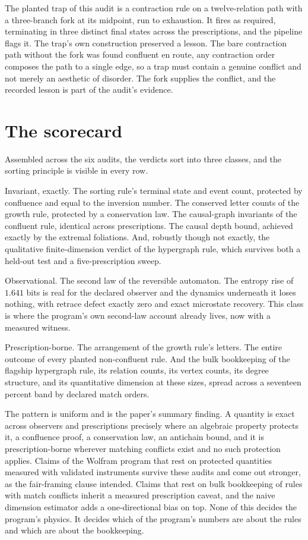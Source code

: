 \documentclass[aps,pre,reprint,nofootinbib]{revtex4-2}
\begin{document}
The planted trap of this audit is a contraction rule on a
twelve-relation path with a three-branch fork at its midpoint, run to
exhaustion.  It fires as required, terminating in three distinct
final states across the prescriptions, and the pipeline flags it.
The trap's own construction preserved a lesson.  The bare contraction
path without the fork was found confluent en route, any contraction
order composes the path to a single edge, so a trap must contain a
genuine conflict and not merely an aesthetic of disorder.  The fork
supplies the conflict, and the recorded lesson is part of the audit's
evidence.

\section{The scorecard}
\label{sec:scorecard}

Assembled across the six audits, the verdicts sort into three classes,
and the sorting principle is visible in every row.

Invariant, exactly.  The sorting rule's terminal state and event
count, protected by confluence and equal to the inversion number.
The conserved letter counts of the growth rule, protected by a
conservation law.  The causal-graph invariants of the confluent rule,
identical across prescriptions.  The causal depth bound, achieved
exactly by the extremal foliations.  And, robustly though not
exactly, the qualitative finite-dimension verdict of the hypergraph
rule, which survives both a held-out test and a five-prescription
sweep.

Observational.  The second law of the reversible automaton.  The
entropy rise of $1.641$ bits is real for the declared observer and
the dynamics underneath it loses nothing, with retrace defect exactly
zero and exact microstate recovery.  This class is where the
program's own second-law account already lives, now with a measured
witness.

Prescription-borne.  The arrangement of the growth rule's letters.
The entire outcome of every planted non-confluent rule.  And the bulk
bookkeeping of the flagship hypergraph rule, its relation counts, its
vertex counts, its degree structure, and its quantitative dimension
at these sizes, spread across a seventeen percent band by declared
match orders.

The pattern is uniform and is the paper's summary finding.  A
quantity is exact across observers and prescriptions precisely where
an algebraic property protects it, a confluence proof, a conservation
law, an antichain bound, and it is prescription-borne wherever
matching conflicts exist and no such protection applies.  Claims of
the Wolfram program that rest on protected quantities measured with
validated instruments survive these audits and come out stronger, as
the fair-framing clause intended.  Claims that rest on bulk
bookkeeping of rules with match conflicts inherit a measured
prescription caveat, and the naive dimension estimator adds a
one-directional bias on top.  None of this decides the program's
physics.  It decides which of the program's numbers are about the
rules and which are about the bookkeeping.
\end{document}
